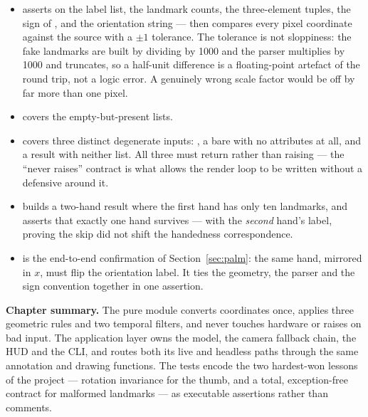 \begin{codecard}

\end{codecard}

\begin{itemize}
  \item \textbf{} asserts on the label list, the landmark counts, the
        three-element  tuples, the sign of , and the orientation string ---
        then compares every pixel coordinate against the source with a $\pm 1$ tolerance. The
        tolerance is not sloppiness: the fake landmarks are built by dividing by 1000 and the parser
        multiplies by 1000 and truncates, so a half-unit difference is a floating-point artefact of
        the round trip, not a logic error. A genuinely wrong scale factor would be off by far more
        than one pixel.
  \item \textbf{} covers the empty-but-present lists.
  \item \textbf{} covers three distinct degenerate
        inputs: , a bare  with no attributes at all, and a result with
        neither list. All three must return \code{[]} rather than raising --- the ``never raises''
        contract is what allows the render loop to be written without a defensive  around
        it.
\end{itemize}

\begin{codecard}

\end{codecard}

\begin{itemize}
  \item \textbf{} builds a two-hand result where the first
        hand has only ten landmarks, and asserts that exactly one hand survives --- with the
        \emph{second} hand's label, proving the skip did not shift the handedness correspondence.
  \item \textbf{} is the end-to-end
        confirmation of Section~\ref{sec:palm}: the same hand, mirrored in $x$, must flip the
        orientation label. It ties the geometry, the parser and the sign convention together in one
        assertion.
\end{itemize}

\begin{keyidea}
\textbf{Chapter summary.} The pure module converts coordinates once, applies three geometric rules
and two temporal filters, and never touches hardware or raises on bad input. The application layer
owns the model, the camera fallback chain, the HUD and the CLI, and routes both its live and headless
paths through the same annotation and drawing functions. The tests encode the two hardest-won
lessons of the project --- rotation invariance for the thumb, and a total, exception-free contract
for malformed landmarks --- as executable assertions rather than comments.
\end{keyidea}
